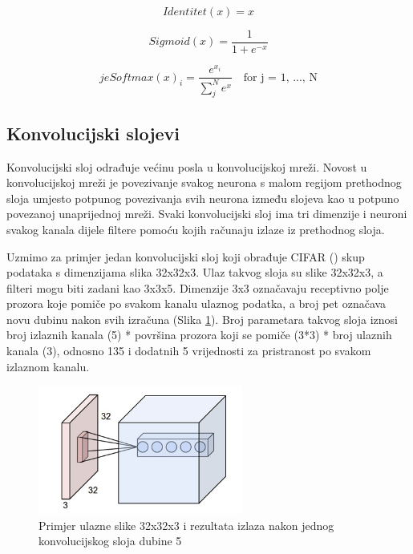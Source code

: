 \documentclass[times, utf8, proizvoljni, numeric]{fer}
\begin{document}
\begin{equation}
\label{eq:f_identiteta}
Identitet(x) = x   
\end{equation}

\begin{equation}
\label{eq:f_sigmoida}
Sigmoid(x) = \frac{1}{1+e^{-x}}    
\end{equation}

\begin{equation}
\label{eq:f_softmax}je
Softmax(x)_i = \frac{e^{x_i}}{\sum_{j}^{N}e^{x}} \quad \text{for j = 1, ..., N}
\end{equation}


\subsection{Konvolucijski slojevi}


Konvolucijski sloj odrađuje većinu posla u konvolucijskoj mreži. Novost u konvolucijskoj mreži je povezivanje svakog neurona s malom regijom prethodnog sloja umjesto potpunog povezivanja svih neurona između slojeva kao u potpuno povezanoj unaprijednoj mreži. Svaki konvolucijski sloj ima tri dimenzije i neuroni svakog kanala dijele filtere pomoću kojih računaju izlaze iz prethodnog sloja.

Uzmimo za primjer jedan konvolucijski sloj koji obrađuje CIFAR (\cite{CIFAR10}) skup podataka s dimenzijama slika 32x32x3. Ulaz takvog sloja su slike 32x32x3, a filteri mogu biti zadani kao 3x3x5. Dimenzije 3x3 označavaju receptivno polje prozora koje pomiče po svakom kanalu ulaznog podatka, a broj pet označava novu dubinu nakon svih izračuna (Slika \ref{fg:konvolucijski_sloj}). Broj parametara takvog sloja iznosi broj izlaznih kanala (5) * površina prozora koji se pomiče (3*3) * broj ulaznih kanala (3), odnosno 135 i dodatnih 5 vrijednosti za pristranost po svakom izlaznom kanalu.

\begin{figure}[!ht]
	\begin{center}
		\captionsetup{justification=centering}
		\includegraphics[width=0.6\textwidth]{./imgs/konvolucijski_sloj.png}
		\caption{Primjer ulazne slike 32x32x3 i rezultata izlaza nakon jednog konvolucijskog sloja dubine 5 \cite{CS231n}}
		\label{fg:konvolucijski_sloj}
	\end{center}
\end{figure}
\end{document}
